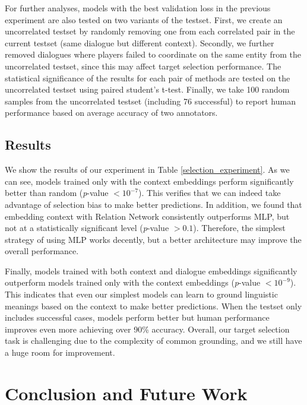 \documentclass[letterpaper]{article} %
\begin{document}
For further analyses, models with the best validation loss in the previous experiment are also tested on two variants of the testset. First, we create an uncorrelated testset by randomly removing one from each correlated pair in the current testset (same dialogue but different context). Secondly, we further removed dialogues where players failed to coordinate on the same entity from the uncorrelated testset, since this may affect target selection performance. The statistical significance of the results for each pair of methods are tested on the uncorrelated testset using paired student's t-test. Finally, we take 100 random samples from the uncorrelated testset (including 76 successful) to report human performance based on average accuracy of two annotators.

\vspace{-0.81mm}
\vspace{-1.44mm}
\subsection{Results}

We show the results of our experiment in Table \ref{selection_experiment}. As we can see, models trained only with the context embeddings perform significantly better than random (\textit{p}-value $<10^{-7}$). This verifies that we can indeed take advantage of selection bias to make better predictions.  In addition, we found that embedding context with Relation Network consistently outperforms MLP, but not at a statistically significant level (\textit{p}-value $>0.1$). Therefore, the simplest strategy of using MLP works decently, but a better architecture may improve the overall performance.

Finally, models trained with both context and dialogue embeddings significantly outperform models trained only with the context embeddings (\textit{p}-value $<10^{-9}$). This indicates that even our simplest models can learn to ground linguistic meanings based on the context to make better predictions. When the testset only includes successful cases, models perform better but human performance improves even more achieving over 90\% accuracy. Overall, our target selection task is challenging due to the complexity of common grounding, and we still have a huge room for improvement.

\vspace{-0.80mm}
\section{Conclusion and Future Work}
\label{section:conclusion}
\end{document}
